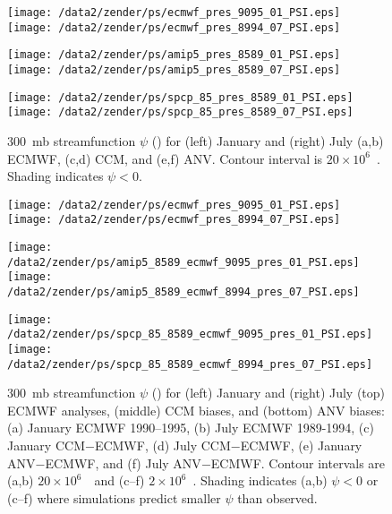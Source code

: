 \documentclass[twocolumn,final]{article}
\begin{document}
\begin{figure*}
\begin{center}
\texttt{[image: /data2/zender/ps/ecmwf\_pres\_9095\_01\_PSI.eps]}%
\texttt{[image: /data2/zender/ps/ecmwf\_pres\_8994\_07\_PSI.eps]}%

\texttt{[image: /data2/zender/ps/amip5\_pres\_8589\_01\_PSI.eps]}%
\texttt{[image: /data2/zender/ps/amip5\_pres\_8589\_07\_PSI.eps]}%

\texttt{[image: /data2/zender/ps/spcp\_85\_pres\_8589\_01\_PSI.eps]}%
\texttt{[image: /data2/zender/ps/spcp\_85\_pres\_8589\_07\_PSI.eps]}%
\end{center}
\caption[300~mb streamfunction $\psi$ for January and
July ECMWF, CCM, and ANV]{
300~mb streamfunction $\psi$ (\mSxs) for (left) January and
(right) July (a,b) ECMWF, (c,d) CCM, and (e,f) ANV.
Contour interval is $20 \times 10^6$~\mSxs. 
Shading indicates $\psi < 0$.
\label{fig:pres_8589_PSI}}
\end{figure*}
\clearpage

\begin{figure*}
\begin{center}
\texttt{[image: /data2/zender/ps/ecmwf\_pres\_9095\_01\_PSI.eps]}%
\texttt{[image: /data2/zender/ps/ecmwf\_pres\_8994\_07\_PSI.eps]}%

\texttt{[image: /data2/zender/ps/amip5\_8589\_ecmwf\_9095\_pres\_01\_PSI.eps]}%
\texttt{[image: /data2/zender/ps/amip5\_8589\_ecmwf\_8994\_pres\_07\_PSI.eps]}%

\texttt{[image: /data2/zender/ps/spcp\_85\_8589\_ecmwf\_9095\_pres\_01\_PSI.eps]}%
\texttt{[image: /data2/zender/ps/spcp\_85\_8589\_ecmwf\_8994\_pres\_07\_PSI.eps]}%
\end{center}
\caption[300~mb streamfunction $\psi$ for January
and July ECMWF analyses, CCM biases, and ANV biases]{
300~mb streamfunction $\psi$ (\mSxs) for (left) January
and (right) July (top) ECMWF analyses, (middle) CCM biases, and (bottom)
ANV biases: (a) January ECMWF 1990--1995, (b) July ECMWF 1989-1994,
(c) January CCM$-$ECMWF, (d) July CCM$-$ECMWF, (e) January
ANV$-$ECMWF, and (f) July ANV$-$ECMWF.
Contour intervals are (a,b) $20 \times 10^6$~\mSxs\ and (c--f) $2
\times 10^6$~\mSxs.
Shading indicates (a,b) $\psi < 0$ or (c--f) where
simulations predict smaller $\psi$ than observed.
\label{fig:pres_8589_PSI}}   
\end{figure*}
\clearpage
\end{document}
